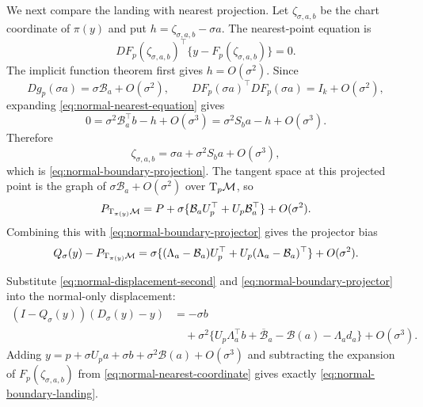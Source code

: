 We next compare the landing with nearest projection.  Let
$\zeta_{\sigma,a,b}$ be the chart coordinate of $\pi(y)$ and put
$h=\zeta_{\sigma,a,b}-\sigma a$.  The nearest-point equation is
\begin{equation}
  DF_p(\zeta_{\sigma,a,b})^\top
  \{y-F_p(\zeta_{\sigma,a,b})\}=0.
  \label{eq:normal-nearest-equation}
\end{equation}
The implicit function theorem first gives $h=O(\sigma^2)$.  Since
\begin{equation}
  Dg_p(\sigma a)=\sigma\mathcal B_a+O(\sigma^2),
  \qquad
  DF_p(\sigma a)^\top DF_p(\sigma a)=I_k+O(\sigma^2),
\end{equation}
expanding \eqref{eq:normal-nearest-equation} gives
\begin{equation}
  0
  =\sigma^2\mathcal B_a^\top b-h+O(\sigma^3)
  =\sigma^2S_ba-h+O(\sigma^3).
\end{equation}
Therefore
\begin{equation}
  \zeta_{\sigma,a,b}
  =\sigma a+\sigma^2S_ba+O(\sigma^3),
  \label{eq:normal-nearest-coordinate}
\end{equation}
which is \eqref{eq:normal-boundary-projection}.  The tangent space at
this projected point is the graph of
$\sigma\mathcal B_a+O(\sigma^2)$ over $\mathrm{T}_p\mathcal{M}$, so
\begin{equation}
  P_{\mathrm{T}_{\pi(y)}\mathcal{M}}
  =
  P+\sigma\{\mathcal B_aU_p^\top+U_p\mathcal B_a^\top\}
  +O(\sigma^2).
  \label{eq:normal-true-projector}
\end{equation}
Combining this with \eqref{eq:normal-boundary-projector} gives the
projector bias
\begin{equation}
  Q_\sigma(y)-P_{\mathrm{T}_{\pi(y)}\mathcal{M}}
  =
  \sigma\{(\Lambda_a-\mathcal B_a)U_p^\top
          +U_p(\Lambda_a-\mathcal B_a)^\top\}
  +O(\sigma^2).
  \label{eq:normal-projector-bias}
\end{equation}

Substitute \eqref{eq:normal-displacement-second} and
\eqref{eq:normal-boundary-projector} into the normal-only displacement:
\begin{align}
  (I-Q_\sigma(y))(D_\sigma(y)-y)
  &=
  -\sigma b\\
  &\quad+\sigma^2\{
     U_p\Lambda_a^\top b
     +\overline{\mathcal B}_a-\mathcal B(a)
     -\Lambda_ad_a
   \}
  +O(\sigma^3).
  \label{eq:normal-landing-displacement}
\end{align}
Adding
$y=p+\sigma U_pa+\sigma b+\sigma^2\mathcal B(a)+O(\sigma^3)$
and subtracting the expansion of
$F_p(\zeta_{\sigma,a,b})$ from
\eqref{eq:normal-nearest-coordinate} gives exactly
\eqref{eq:normal-boundary-landing}.

